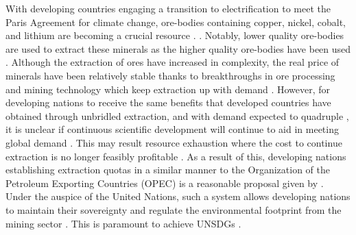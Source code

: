 \documentclass[12pt]{article}
\begin{document}
With developing countries engaging a transition to electrification to meet the Paris Agreement for climate change, ore-bodies containing copper, nickel, cobalt, and lithium are becoming a crucial resource \cite{Book:Governance_Resources}. \cite{Report:IEA_Executive_Summary}. Notably, lower quality ore-bodies are used to extract these minerals as the higher quality ore-bodies have been used \cite{News:Environmental_Regulation, Report:IEA_Executive_Summary, Article:Mining_Industry, Book:Governance_Resources, Book:Metal_Recycling}. Although the extraction of ores have increased in complexity, the real price of minerals have been relatively stable thanks to breakthroughs in ore processing and mining technology which keep extraction up with demand \cite{Book:Governance_Resources}. However, for developing nations to receive the same benefits that developed countries have obtained through unbridled extraction, and with demand expected to quadruple \cite{Report:IEA_Executive_Summary}, it is unclear if continuous scientific development will continue to aid in meeting global demand \cite{Book:Governance_Resources}. This may result resource exhaustion where the cost to continue extraction is no longer feasibly profitable \cite{Book:Governance_Resources}. As a result of this, developing nations establishing extraction quotas in a similar manner to the Organization of the Petroleum Exporting Countries (OPEC) is a reasonable proposal given by \citeauthor{Book:Governance_Resources} \cite{Book:Governance_Resources}. Under the auspice of the United Nations, such a system allows developing nations to maintain their sovereignty and regulate the environmental footprint from the mining sector \cite{Book:Governance_Resources}. This is paramount to achieve UNSDGs \cite{Book:MRG_Sustainable_Report}.
\end{document}
